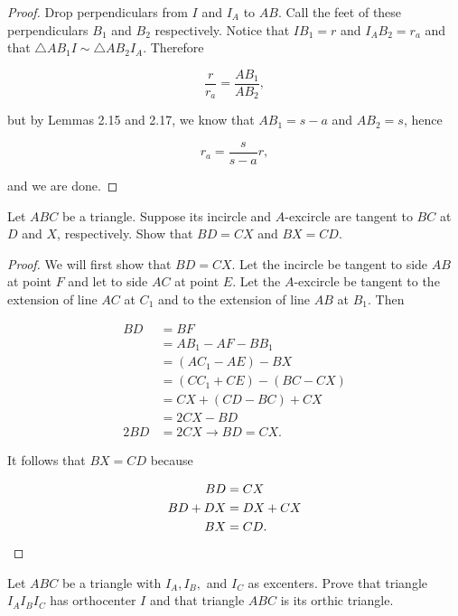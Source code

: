 \documentclass[letterpaper,oneside]{scrartcl}
\begin{document}
\begin{proof}
  Drop perpendiculars from $I$ and $I_A$ to $AB$. Call the feet of these perpendiculars $B_1$ and $B_2$ respectively. Notice that $IB_1 = r$ and $I_AB_2 = r_a$ and that $\triangle AB_1I \sim \triangle AB_2I_A$. Therefore

  $$\frac{r}{r_a} = \frac{AB_1}{AB_2},$$

  but by Lemmas 2.15 and 2.17, we know that $AB_1 = s-a$ and $AB_2 = s$, hence

  $$r_a = \frac{s}{s-a}r,$$

  and we are done.
\end{proof}

\begin{lemma*}
  [2.20]
  Let $ABC$ be a triangle. Suppose its incircle and $A$-excircle are tangent to $BC$ at $D$ and $X$, respectively. Show that $BD = CX$ and $BX = CD$.
\end{lemma*}

\begin{proof}  We will first show that $BD=CX$. Let the incircle be tangent to side $AB$ at point $F$ and let to side $AC$ at point $E$. Let the $A$-excircle be tangent to the extension of line $AC$ at $C_1$ and to the extension of line $AB$ at $B_1$. Then

  \begin{align*}
    BD  & = BF                      \\
        & = AB_1 - AF - BB_1        \\
        & = (AC_1 - AE) - BX        \\
        & = (CC_1 + CE) - (BC - CX) \\
        & = CX + (CD - BC) + CX     \\
        & = 2CX - BD                \\
    2BD & =2CX \rightarrow BD = CX.
  \end{align*}

  It follows that $BX=CD$ because

  \begin{align*}
    BD      & = CX         \\
    BD + DX & = DX + CX    \\
    BX      & = CD. \space
  \end{align*}
\end{proof}
\begin{lemma*}
  [2.24]
  Let $ABC$ be a triangle with $I_A, I_B,$ and $I_C$ as excenters. Prove that triangle $I_AI_BI_C$ has orthocenter $I$ and that triangle $ABC$ is its orthic triangle.
\end{lemma*}
\end{document}
